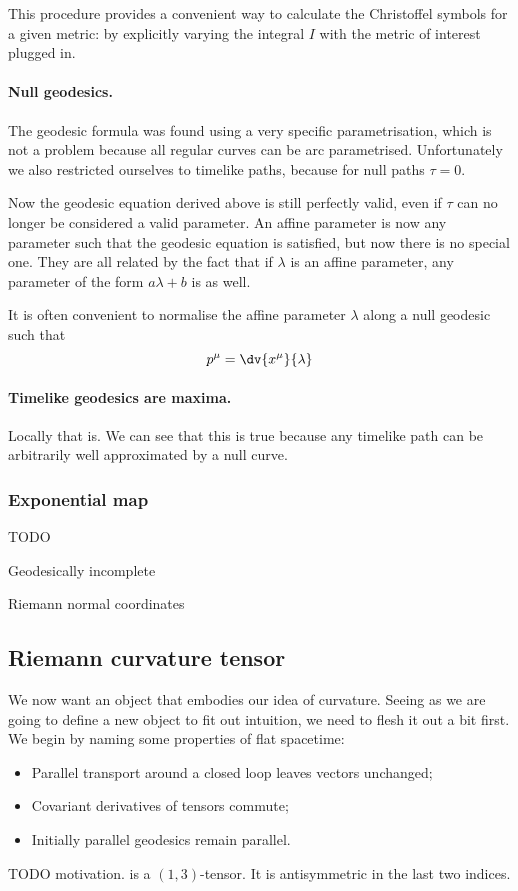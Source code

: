 This procedure provides a convenient way to calculate the Christoffel symbols for a given metric: by explicitly varying the integral $I$ with the metric of interest plugged in.

\paragraph{Null geodesics.} The geodesic formula was found using a very specific parametrisation, which is not a problem because all regular curves can be arc parametrised. Unfortunately we also restricted ourselves to timelike paths, because for null paths $\tau = 0$.

Now the geodesic equation derived above is still perfectly valid, even if $\tau$ can no longer be considered a valid parameter. An affine parameter is now any parameter such that the geodesic equation is satisfied, but now there is no special one. They are all related by the fact that if $\lambda$ is an affine parameter, any parameter of the form $a\lambda + b$ is as well. 

It is often convenient to normalise the affine parameter $\lambda$ along a null geodesic such that
\[ p^\mu = \dv{x^\mu}{\lambda} \]

\paragraph{Timelike geodesics are maxima.} Locally that is. We can see that this is true because any timelike path can be arbitrarily well approximated by a null curve.

\subsubsection{Exponential map}
TODO

Geodesically incomplete

Riemann normal coordinates

\subsection{Riemann curvature tensor}
We now want an object that embodies our idea of curvature. Seeing as we are going to define a new object to fit out intuition, we need to flesh it out a bit first. We begin by naming some properties of flat spacetime:
\begin{itemize}
\item Parallel transport around a closed loop leaves vectors unchanged;
\item Covariant derivatives of tensors commute;
\item Initially parallel geodesics remain parallel.
\end{itemize}
TODO motivation.
 is a $(1,3)$-tensor. It is antisymmetric in the last two indices.

